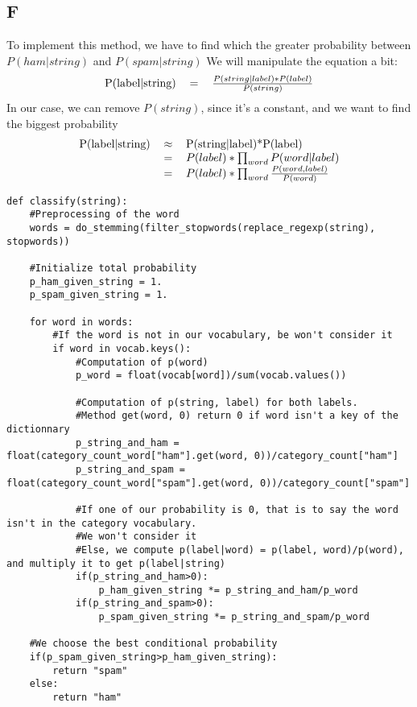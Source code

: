\documentclass{article}
\begin{document}
        \subsection{F}
            To implement this method, we have to find which the greater probability between $P(ham|string)$ and $P(spam|string)$
            We will manipulate the equation a bit:
            \[
                \begin{tabular}{rcl}
                    P(label|string) & = & $\frac{P(string|label)*P(label)}{P(string)}$
                \end{tabular}
            \]
            In our case, we can remove $P(string)$, since it's a constant, and we want to find the biggest probability
            \[
                \begin{tabular}{rcl}
                    P(label|string) &$\approx$& P(string|label)*P(label)\\
                    & = & $P(label)*\prod_{word}P(word|label)$\\
                    & = & $P(label)*\prod_{word}\frac{P(word, label)}{P(word)}$\\
                \end{tabular}
            \]
            \begin{verbatim}
def classify(string):
    #Preprocessing of the word
    words = do_stemming(filter_stopwords(replace_regexp(string), stopwords))

    #Initialize total probability
    p_ham_given_string = 1.
    p_spam_given_string = 1.

    for word in words:
        #If the word is not in our vocabulary, be won't consider it
        if word in vocab.keys():
            #Computation of p(word)
            p_word = float(vocab[word])/sum(vocab.values())

            #Computation of p(string, label) for both labels.
            #Method get(word, 0) return 0 if word isn't a key of the dictionnary
            p_string_and_ham = float(category_count_word["ham"].get(word, 0))/category_count["ham"]
            p_string_and_spam = float(category_count_word["spam"].get(word, 0))/category_count["spam"]

            #If one of our probability is 0, that is to say the word isn't in the category vocabulary.
            #We won't consider it
            #Else, we compute p(label|word) = p(label, word)/p(word), and multiply it to get p(label|string)
            if(p_string_and_ham>0):
                p_ham_given_string *= p_string_and_ham/p_word
            if(p_string_and_spam>0):
                p_spam_given_string *= p_string_and_spam/p_word

    #We choose the best conditional probability
    if(p_spam_given_string>p_ham_given_string):
        return "spam"
    else:
        return "ham"
            \end{verbatim}
\end{document}
